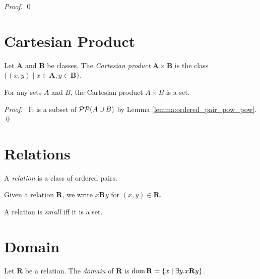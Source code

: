 \begin{proof}
    \pf
    \qed
\end{proof}

\section{Cartesian Product}

\begin{definition}
    Let $\mathbf{A}$ and $\mathbf{B}$ be classes. The \emph{Cartesian product} 
    $\mathbf{A} \times \mathbf{B}$ is the class
    $\{ (x,y) \mid x \in \mathbf{A}, y \in \mathbf{B} \}$.
\end{definition}

\begin{theorem}
    For any sets $A$ and $B$, the Cartesian product $A \times B$ is a set.
\end{theorem}

\begin{proof}
    \pf\ It is a subset of $\mathcal{P} \mathcal{P} (A \cup B)$ by Lemma \ref{lemma:ordered_pair_pow_pow}. \qed
\end{proof}

\section{Relations}

\begin{definition}[Relation]
    A \emph{relation} is a class of ordered pairs.

    Given a relation $\mathbf{R}$, we write $x\mathbf{R}y$ for $(x,y) \in \mathbf{R}$.

    A relation is \emph{small} iff it is a set.
\end{definition}

\section{Domain}

\begin{definition}[Domain]
    Let $\mathbf{R}$ be a relation. The \emph{domain} of $\mathbf{R}$ is 
    $\operatorname{dom} \mathbf{R} = \{ x \mid \exists y. x\mathbf{R}y \}$.
\end{definition}

